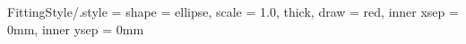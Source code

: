 \tikzset
{
    FittingStyle/.style =
    {
        shape = ellipse,                            %
        scale           = 1.0,                  %
        thick,                                  %
        draw            = red,              %
        inner xsep      = 0mm,                  %
        inner ysep      = 0mm                   %
    }
}



